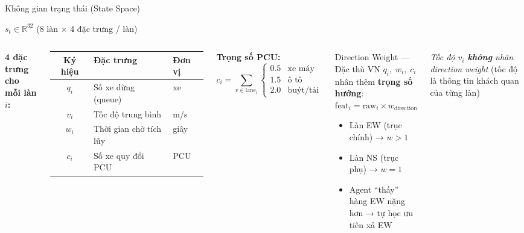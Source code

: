 \begin{frame}{Không gian trạng thái (State Space)}
  \begin{block}{}
    \centering $s_t \in \mathbb{R}^{32}$ \quad (8 làn $\times$ 4 đặc trưng / làn)
  \end{block}
  \vspace{6pt}
  \begin{columns}[T]
    \textbf{4 đặc trưng cho mỗi làn $i$:}
    \vspace{4pt}
    \begin{tabular}{@{}cll}
      \toprule
      \textbf{Ký hiệu} & \textbf{Đặc trưng} & \textbf{Đơn vị}\\
      \midrule
      $q_i$ & Số xe dừng (queue) & xe\\
      $v_i$ & Tốc độ trung bình & m/s\\
      $w_i$ & Thời gian chờ tích lũy & giây\\
      $c_i$ & Số xe quy đổi PCU & PCU\\
      \bottomrule
    \end{tabular}

    \vspace{8pt}
    \textbf{Trọng số PCU:}
    \[c_i = \sum_{v\in\text{lane}_i}\begin{cases}0.5 & \text{xe máy}\\1.5 & \text{ô tô}\\2.0 & \text{buýt/tải}\end{cases}\]

    \begin{alertblock}{Direction Weight --- Đặc thù VN}
      $q_i,\; w_i,\; c_i$ nhân thêm \textbf{trọng số hướng}:\\[4pt]
      $\text{feat}_i = \text{raw}_i \times w_{\text{direction}}$\\[4pt]
      \begin{itemize}
        \item Làn EW (trục chính) → $w > 1$
        \item Làn NS (trục phụ) → $w = 1$
        \item Agent ``thấy'' hàng EW nặng hơn → tự học ưu tiên xả EW
      \end{itemize}
    \end{alertblock}
    \vspace{4pt}
    \textit{Tốc độ $v_i$ \textbf{không} nhân direction weight} (tốc độ là thông tin khách quan của từng làn)
  \end{columns}
\end{frame}

